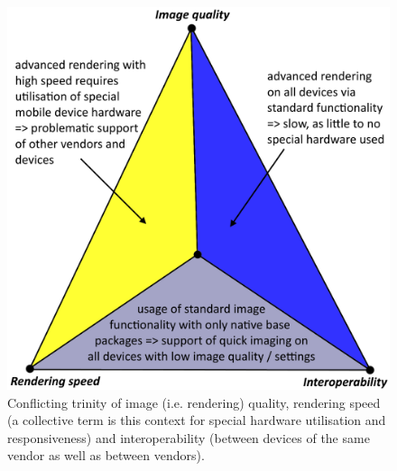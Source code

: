 \documentclass[review]{elsarticle}
\begin{document}
\begin{figure}[h]
\centering
\includegraphics[width=0.75\columnwidth]{graphics/ImagingTrinity}
\caption{Conflicting trinity of image (i.e. rendering) quality, rendering speed (a collective term is this context for special hardware utilisation and responsiveness) and interoperability (between devices of the same vendor as well as between vendors).}
\label{fig:technology:graphics:imagingTrinity}
\end{figure}

\end{document}
